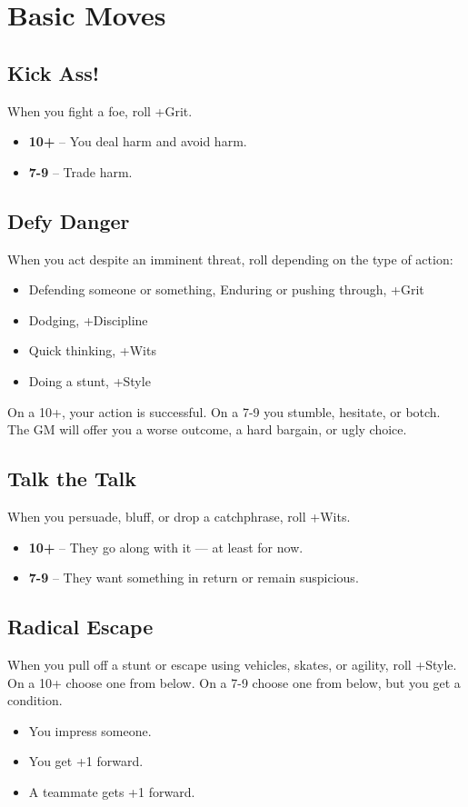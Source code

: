 \documentclass{book}
\begin{document}
\chapter*{Basic Moves}

\section*{Kick Ass!}
When you fight a foe, roll +Grit.
\begin{itemize}
    \item \textbf{10+} -- You deal harm and avoid harm.
    \item \textbf{7-9} -- Trade harm.
\end{itemize}

\section*{Defy Danger}
When you act despite an imminent threat, roll depending on the type of action:
\begin{itemize}
    \item Defending someone or something, Enduring or pushing through, +Grit
    \item Dodging, +Discipline
    \item Quick thinking, +Wits
    \item Doing a stunt, +Style
\end{itemize}
On a 10+, your action is successful. On a 7-9 you stumble, hesitate, or botch. The GM will offer you a worse outcome, a hard bargain, or ugly choice. 

\section*{Talk the Talk}
When you persuade, bluff, or drop a catchphrase, roll +Wits.
\begin{itemize}
    \item \textbf{10+} -- They go along with it — at least for now.
    \item \textbf{7-9} -- They want something in return or remain suspicious.
\end{itemize}

\section*{Radical Escape}
When you pull off a stunt or escape using vehicles, skates, or agility, roll +Style. On a 10+ choose one from below. On a 7-9 choose one from below, but you get a condition.
\begin{itemize}
    \item You impress someone.
    \item You get +1 forward.
    \item A teammate gets +1 forward.
\end{itemize}
\end{document}
